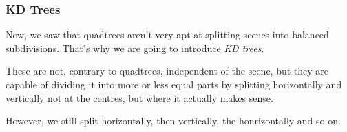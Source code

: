\documentclass{panikzettel}
\begin{document}
\subsubsection*{KD Trees}

\begin{halfboxl}
Now, we saw that quadtrees aren't very apt at splitting scenes into balanced subdivisions. That's why we are going to introduce \emph{KD trees}.

These are not, contrary to quadtrees, independent of the scene, but they are capable of dividing it into more or less equal parts by splitting horizontally and vertically not at the centres, but where it actually makes sense.

However, we still split horizontally, then vertically, the honrizontally and so on.
\end{halfboxl}%
\end{document}
